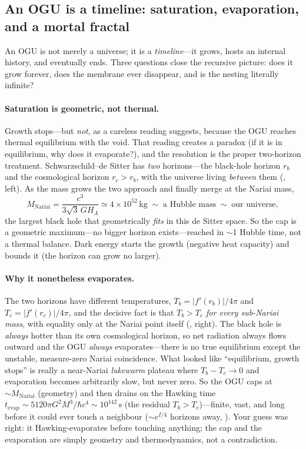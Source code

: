 \subsection{An OGU is a timeline: saturation, evaporation, and a mortal fractal}
\label{sec:recursion-depth}

An OGU is not merely a universe; it is a \emph{timeline}---it grows, hosts an
internal history, and eventually ends. Three questions close the recursive picture:
does it grow forever, does the membrane ever disappear, and is the nesting literally
infinite?

\paragraph{Saturation is geometric, not thermal.} Growth stops---but \emph{not}, as a
careless reading suggests, because the OGU reaches thermal equilibrium with the void.
That reading creates a paradox (if it is in equilibrium, why does it evaporate?), and
the resolution is the proper two-horizon treatment. Schwarzschild--de Sitter has
\emph{two} horizons---the black-hole horizon $r_b$ and the cosmological horizon
$r_c>r_b$, with the universe living \emph{between} them (, left). As the
mass grows the two approach and finally merge at the Nariai mass,
\begin{equation}
  M_{\mathrm{Nariai}} = \frac{c^3}{3\sqrt3\,GH_\Lambda} \simeq 4\times10^{52}\,
  \mathrm{kg} \;\sim\; \text{a Hubble mass} \;\sim\; \text{our universe},
  \label{eq:Meq}
\end{equation}
the largest black hole that geometrically \emph{fits} in this de Sitter space. So the
cap is a geometric maximum---no bigger horizon exists---reached in $\sim$1 Hubble
time, not a thermal balance. Dark energy starts the growth (negative heat capacity)
and bounds it (the horizon can grow no larger).

\paragraph{Why it nonetheless evaporates.} The two horizons have different
temperatures, $T_b=|f'(r_b)|/4\pi$ and $T_c=|f'(r_c)|/4\pi$, and the decisive fact is
that \emph{$T_b>T_c$ for every sub-Nariai mass}, with equality only at the Nariai
point itself (, right). The black hole is \emph{always} hotter than its
own cosmological horizon, so net radiation always flows outward and the OGU
\emph{always} evaporates---there is no true equilibrium except the unstable,
measure-zero Nariai coincidence. What looked like ``equilibrium, growth stops'' is
really a near-Nariai \emph{lukewarm} plateau where $T_b-T_c\to0$ and evaporation
becomes arbitrarily slow, but never zero. So the OGU caps at $\sim M_{\mathrm{Nariai}}$
(geometry) and then drains on the Hawking time $t_{\mathrm{evap}}\sim5120\pi G^2
M^3/\hbar c^4\sim10^{142}\,\mathrm{s}$ (the residual $T_b>T_c$)---finite, vast, and
long before it could ever touch a neighbour ($\sim e^{I/4}$ horizons away,
). Your guess was right: it Hawking-evaporates before touching
anything; the cap and the evaporation are simply geometry and thermodynamics, not a
contradiction.

